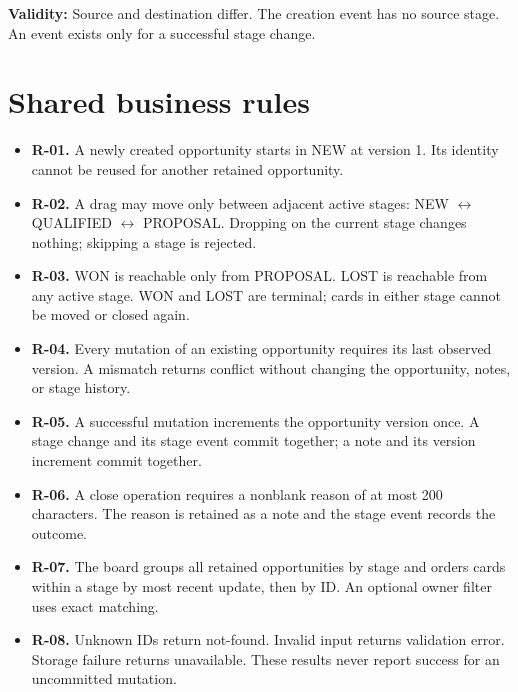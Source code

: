\documentclass[10pt,a4paper]{article}
\begin{document}
\textbf{Validity:} Source and destination differ. The creation event has no source stage. An event exists only for a successful stage change.

\section{Shared business rules}

\begin{itemize}

\item \textbf{R-01.} A newly created opportunity starts in NEW at version 1. Its identity cannot be reused for another retained opportunity.

\item \textbf{R-02.} A drag may move only between adjacent active stages: NEW \(\leftrightarrow\) QUALIFIED \(\leftrightarrow\) PROPOSAL. Dropping on the current stage changes nothing; skipping a stage is rejected.

\item \textbf{R-03.} WON is reachable only from PROPOSAL. LOST is reachable from any active stage. WON and LOST are terminal; cards in either stage cannot be moved or closed again.

\item \textbf{R-04.} Every mutation of an existing opportunity requires its last observed version. A mismatch returns conflict without changing the opportunity, notes, or stage history.

\item \textbf{R-05.} A successful mutation increments the opportunity version once. A stage change and its stage event commit together; a note and its version increment commit together.

\item \textbf{R-06.} A close operation requires a nonblank reason of at most 200 characters. The reason is retained as a note and the stage event records the outcome.

\item \textbf{R-07.} The board groups all retained opportunities by stage and orders cards within a stage by most recent update, then by ID. An optional owner filter uses exact matching.

\item \textbf{R-08.} Unknown IDs return not-found. Invalid input returns validation error. Storage failure returns unavailable. These results never report success for an uncommitted mutation.

\end{itemize}
\end{document}
